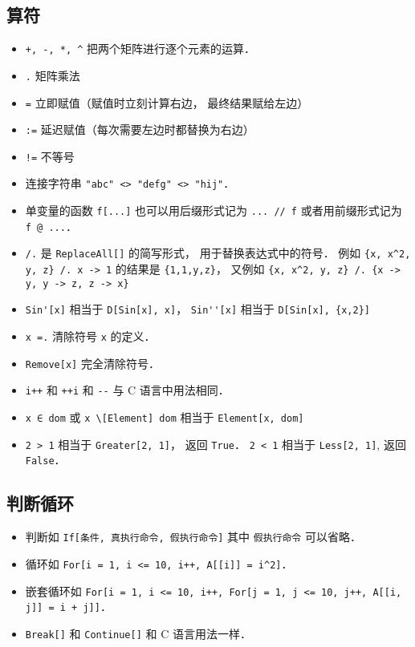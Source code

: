 \subsection{算符}
\begin{itemize}
\item \verb|+, -, *, ^| 把两个矩阵进行逐个元素的运算．
\item \verb|.| 矩阵乘法
\item \verb|=| 立即赋值（赋值时立刻计算右边， 最终结果赋给左边）
\item \verb|:=| 延迟赋值（每次需要左边时都替换为右边）
\item \verb|!=| 不等号
\item 连接字符串 \verb|"abc" <> "defg" <> "hij"|．
\item 单变量的函数 \verb|f[...]| 也可以用后缀形式记为 \verb|... // f| 或者用前缀形式记为 \verb|f @ ...|．
\item \verb|/.| 是 \verb|ReplaceAll[]| 的简写形式， 用于替换表达式中的符号． 例如 \verb|{x, x^2, y, z} /. x -> 1| 的结果是 \verb|{1,1,y,z}|， 又例如 \verb|{x, x^2, y, z} /. {x -> y, y -> z, z -> x}|
\item \verb|Sin'[x]| 相当于 \verb|D[Sin[x], x]|， \verb|Sin''[x]| 相当于 \verb|D[Sin[x], {x,2}]|
\item \verb|x =.| 清除符号 \verb|x| 的定义．
\item \verb|Remove[x]| 完全清除符号．
\item \verb|i++| 和 \verb|++i| 和 \verb|--| 与 C 语言中用法相同．
\item \verb|x ∈ dom| 或 \verb|x \[Element] dom| 相当于 \verb|Element[x, dom]|
\item \verb|2 > 1| 相当于 \verb|Greater[2, 1]|， 返回 \verb|True|． \verb|2 < 1| 相当于 \verb|Less[2, 1]|, 返回 \verb|False|．
\end{itemize}

\subsection{判断循环}
\begin{itemize}
\item 判断如 \verb|If[条件, 真执行命令, 假执行命令]| 其中 \verb|假执行命令| 可以省略．
\item 循环如 \verb|For[i = 1, i <= 10, i++, A[[i]] = i^2]|．
\item 嵌套循环如 \verb|For[i = 1, i <= 10, i++, For[j = 1, j <= 10, j++, A[[i, j]] = i + j]]|．
\item \verb|Break[]| 和 \verb|Continue[]| 和 C 语言用法一样．
\end{itemize}

